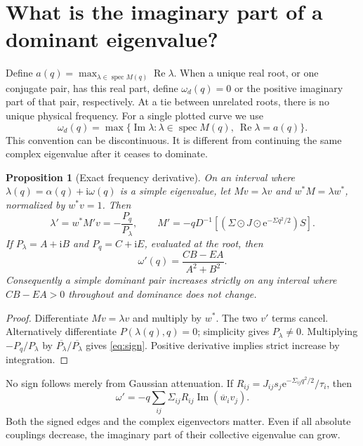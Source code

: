 \documentclass[11pt]{article}
\newtheorem{proposition}{Proposition}
\newcommand{\ee}{\mathrm e}
\newcommand{\ii}{\mathrm i}
\newcommand{\Rea}{\operatorname{Re}}
\newcommand{\Ima}{\operatorname{Im}}
\newcommand{\spec}{\operatorname{spec}}
\begin{document}
\newpage
\section{What is the imaginary part of a dominant eigenvalue?}
Define $a(q)=\max_{\lambda\in\spec M(q)}\Rea\lambda$. When a unique real root,
or one conjugate pair, has this real part, define $\omega_d(q)=0$ or the
positive imaginary part of that pair, respectively. At a tie between unrelated
roots, there is no unique physical frequency. For a single plotted curve we use
\begin{equation}
 \omega_d(q)=\max\{\Ima\lambda:\lambda\in\spec M(q),\ \Rea\lambda=a(q)\}.
 \label{eq:dominance}
\end{equation}
This convention can be discontinuous. It is different from continuing the same
complex eigenvalue after it ceases to dominate.

\begin{proposition}[Exact frequency derivative]
On an interval where $\lambda(q)=\alpha(q)+\ii\omega(q)$ is a simple eigenvalue,
let $Mv=\lambda v$ and $w^*M=\lambda w^*$, normalized by $w^*v=1$.
Then
\begin{equation}
 \lambda'=w^*M'v=-\frac{P_q}{P_\lambda},\qquad
 M'=-qD^{-1}[(\Sigma\odot J\odot\ee^{-\Sigma q^2/2})S].
 \label{eq:derivative}
\end{equation}
If $P_\lambda=A+\ii B$ and $P_q=C+\ii E$, evaluated at the root, then
\begin{equation}
 \boxed{\omega'(q)=\frac{CB-EA}{A^2+B^2}}.
 \label{eq:sign}
\end{equation}
Consequently a simple dominant pair increases strictly on any interval where
$CB-EA>0$ throughout and dominance does not change.
\end{proposition}
\begin{proof}
Differentiate $Mv=\lambda v$ and multiply by $w^*$. The two $v'$ terms cancel.
Alternatively differentiate $P(\lambda(q),q)=0$; simplicity gives
$P_\lambda\ne0$. Multiplying $-P_q/P_\lambda$ by
$\overline{P_\lambda}/\overline{P_\lambda}$ gives \eqref{eq:sign}.
Positive derivative implies strict increase by integration.
\end{proof}
No sign follows merely from Gaussian attenuation. If
$R_{ij}=J_{ij}s_j\ee^{-\Sigma_{ij}q^2/2}/\tau_i$, then
\begin{equation}
 \omega'=-q\sum_{ij}\Sigma_{ij}R_{ij}\Ima(\overline w_i v_j).
 \label{eq:edges}
\end{equation}
Both the signed edges and the complex eigenvectors matter. Even if all absolute
couplings decrease, the imaginary part of their collective eigenvalue can grow.
\end{document}

